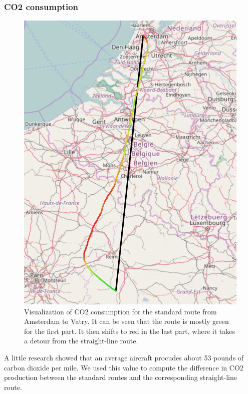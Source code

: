 \documentclass{vldb}
\begin{document}
\subsubsection{CO2 consumption}

\begin{figure}[t]
  \centering
  \includegraphics[scale=0.4]{imgs/amsterdam-vatry-co2.png}
  \caption{Visualization of CO2 consumption for the standard route from
    Amsterdam to Vatry. It can be seen that the route is mostly green for the
    first part. It then shifts to red in the last part, where it takes a detour
    from the straight-line route.}
  \label{fig:amsterdam-vatry}
\end{figure}

A little research showed that an average aircraft procudes about 53 pounds of
carbon dioxide per mile. We used this value to compute the difference in CO2
production between the standard routes and the corresponding straight-line
route.
\end{document}
